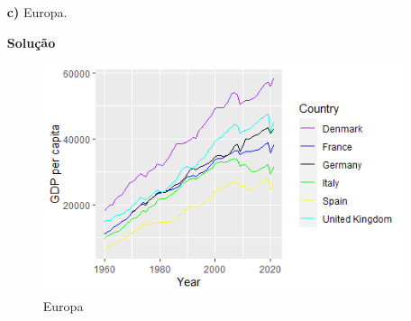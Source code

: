 \documentclass[12pt, a4paper]{article}
\begin{document}
\begin{itemize}
	
	
	\item[\textbf{c)}] Europa.
	
	
	\textbf{Solução}
	
	
	
	
	\begin{figure}[H]
		\caption{Europa}
		\centering
		\includegraphics[scale=1.2]{images/europe.png}
	\end{figure}
	
	
	
\end{itemize}


	
\end{document}
